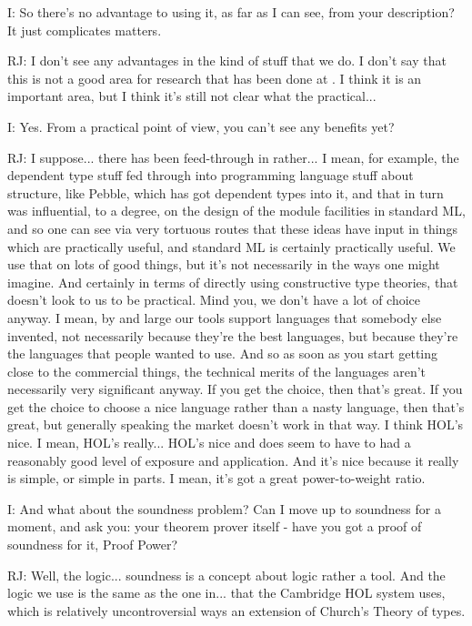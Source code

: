 \documentclass[10pt,titlepage]{book}
\begin{document}
I: So there's no advantage to using it, as far as I can see, from your description? It just complicates matters.

RJ: I don't see any advantages in the kind of stuff that we do. I don't say that this is not a good area for research that has been done at	. I think it is an important area, but I think it's still not clear what the practical...

I: Yes. From a practical point of view, you can't see any benefits yet?

RJ: I suppose... there has been feed-through in rather... I mean, for example, the dependent type stuff fed through into programming language stuff about structure, like Pebble, which has got dependent types into it, and that in turn was influential, to a degree, on the design of the module facilities in standard ML, and so one can see via very tortuous routes that these ideas have input in things which are practically useful, and standard ML is certainly practically useful. We use that on lots of good things, but it's not necessarily in the ways one might imagine. And certainly in terms of directly using constructive type theories, that doesn't look to us to be practical. Mind you, we don't have a lot of choice anyway. I mean, by and large our tools support languages that somebody else invented, not necessarily because they're the best languages, but because they're the languages that people wanted to use. And so as soon as you start getting close to the commercial things, the technical merits of the languages aren't necessarily very significant anyway. If you get the choice, then that's great. If you get the choice to choose a nice language rather than a nasty language, then that's great, but generally speaking the market doesn't work in that way. I think HOL's nice. I mean, HOL's really... HOL's nice and does seem to have to had a reasonably good level of exposure and application. And it's nice because it really is simple, or simple in parts. I mean, it's got a great power-to-weight ratio.

I: And what about the soundness problem? Can I move up to soundness for a moment, and ask you: your theorem prover itself - have you got a proof of soundness for it, Proof Power?

RJ: Well, the logic... soundness is a concept about logic rather a tool. And the logic we use is the same as the one in... that the Cambridge HOL system uses, which is relatively uncontroversial ways an extension of Church's Theory of types.
\end{document}
